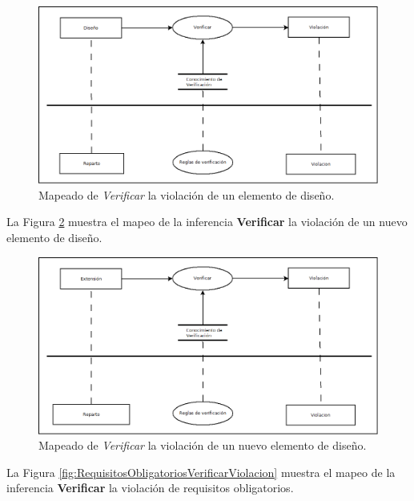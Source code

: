 \begin{figure}[H]
  \centering
  \includegraphics[scale=0.35]{imaxes/DisenoVerificarViolacion.png}
  \caption{\label{fig:DisenoVerificarViolacion}Mapeado de \textit{Verificar} la violación de un elemento de diseño.}
\end{figure}

La Figura \ref{fig:ExtensionVerificarViolacion} muestra el mapeo de la inferencia \textbf{Verificar} la violación de un nuevo elemento de diseño.

\begin{figure}[H]
  \centering
  \includegraphics[scale=0.35]{imaxes/ExtensionVerificarViolacion.png}
  \caption{\label{fig:ExtensionVerificarViolacion}Mapeado de \textit{Verificar} la violación de un nuevo elemento de diseño.}
\end{figure}

La Figura \ref{fig:RequisitosObligatoriosVerificarViolacion} muestra el mapeo de la inferencia \textbf{Verificar} la violación de requisitos obligatorios.

